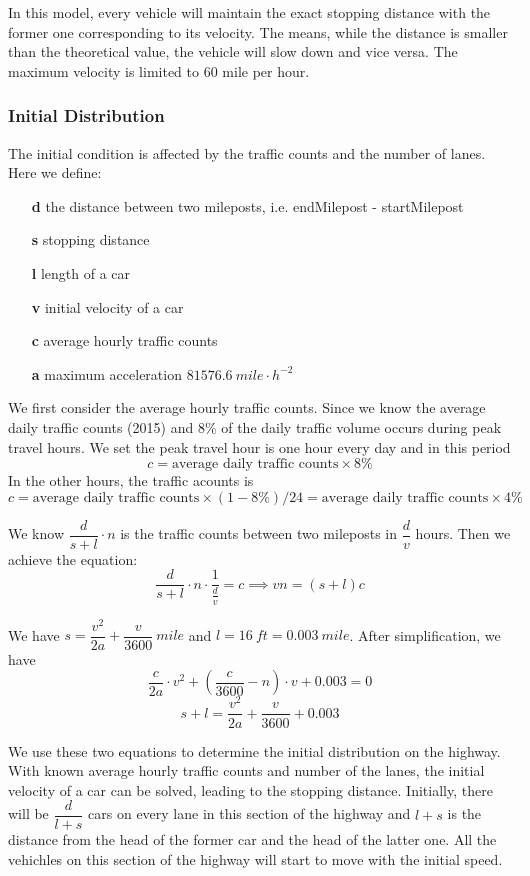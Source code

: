 \documentclass[a4paper]{article}
\begin{document}
	In this model, every vehicle will maintain the exact stopping distance with the former one corresponding to its velocity. The means, while the distance is smaller than the theoretical value, the vehicle will slow down and vice versa. The maximum velocity is limited to 60 mile per hour.

	\subsubsection{Initial Distribution}
	The initial condition is affected by the traffic counts and the number of lanes. Here we define:
	\begin{enumerate}
		\item [\textbf{d}] the distance between two mileposts, i.e. endMilepost - startMilepost
		\item [\textbf{s}] stopping distance
		\item [\textbf{l}] length of a car
		\item [\textbf{v}] initial velocity of a car
		\item [\textbf{c}] average hourly traffic counts
		\item [\textbf{a}] maximum acceleration $ 81576.6\ mile\cdot h^{-2} $
	\end{enumerate}
	We first consider the average hourly traffic counts. Since we know the average daily traffic counts (2015) and 8\% of the daily traffic volume occurs during peak travel hours. We set the peak travel hour is one hour every day and in this period $$ c=\text{average daily traffic counts}\times 8\% $$ In the other hours, the traffic acounts is  $$ c=\text{average daily traffic counts}\times (1-8\%)/24=\text{average daily traffic counts}\times 4\%  $$

	We know $ \dfrac{d}{s+l}\cdot n $ is the traffic counts between two mileposts in $ \dfrac{d}{v} $ hours. Then we achieve the equation:
	$$ \dfrac{d}{s+l}\cdot n\cdot\frac{1}{\frac{d}{v}}=c\implies vn=(s+l)c $$

	We have $ s=\dfrac{v^2}{2a}+\dfrac{v}{3600}\ mile $ and $ l=16\ ft=0.003\ mile $. After simplification, we have
	$$ \dfrac{c}{2a}\cdot v^2+\left(\dfrac{c}{3600}-n\right)\cdot v+0.003=0 $$
	$$ s+l=\dfrac{v^2}{2a}+\dfrac{v}{3600}+0.003 $$

	We use these two equations to determine the initial distribution on the highway. With known average hourly traffic counts and number of the lanes, the initial velocity of a car can be solved, leading to the stopping distance. Initially, there will be $ \dfrac{d}{l+s} $ cars on every lane in this section of the highway and $ l+s $ is the distance from the head of the former car and the head of the latter one. All the vehichles on this section of the highway will start to move with the initial speed.
\end{document}
